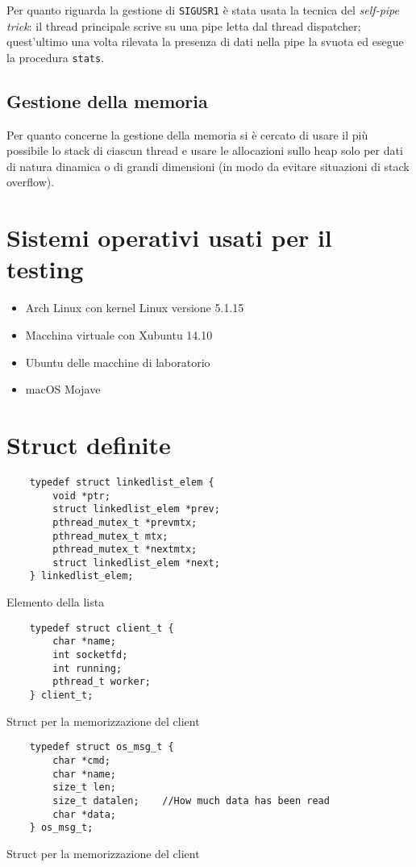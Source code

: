 \documentclass[a4paper,11pt]{article}
\begin{document}
Per quanto riguarda la gestione di \texttt{SIGUSR1} è stata usata la tecnica del \emph{self-pipe trick}: il thread principale scrive su una pipe letta dal thread dispatcher; quest'ultimo
una volta rilevata la presenza di dati nella pipe la svuota ed esegue la procedura \texttt{stats}.

\subsection{Gestione della memoria}
Per quanto concerne la gestione della memoria si è cercato di usare il più possibile lo stack di ciascun thread e usare le allocazioni sullo heap solo per dati
di natura dinamica o di grandi dimensioni (in modo da evitare situazioni di stack overflow).

\begin{appendices}
\section{Sistemi operativi usati per il testing}
\begin{itemize}
    \item Arch Linux con kernel Linux versione 5.1.15
    \item Macchina virtuale con Xubuntu 14.10
    \item Ubuntu delle macchine di laboratorio
    \item macOS Mojave
\end{itemize}

\section{Struct definite}


\begin{listing}[ht]
    \begin{verbatim}
    typedef struct linkedlist_elem {
        void *ptr;
        struct linkedlist_elem *prev;
        pthread_mutex_t *prevmtx;
        pthread_mutex_t mtx;
        pthread_mutex_t *nextmtx;
        struct linkedlist_elem *next;
    } linkedlist_elem;
    \end{verbatim}
    \caption{Elemento della lista}
\end{listing}

\begin{listing}[ht]
    \begin{verbatim}
    typedef struct client_t {
        char *name;
        int socketfd;
        int running;
        pthread_t worker;
    } client_t;
    \end{verbatim}
    \caption{Struct per la memorizzazione del client}
\end{listing}

\begin{listing}[ht]
    \begin{verbatim}
    typedef struct os_msg_t {
        char *cmd;
        char *name;
        size_t len;
        size_t datalen;    //How much data has been read
        char *data;
    } os_msg_t;
    \end{verbatim}
    \caption{Struct per la memorizzazione del client}
\end{listing}
\end{appendices}
\end{document}
